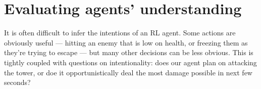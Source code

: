 \documentclass[ocean-paper.tex]{subfiles}
\begin{document}
\section{Evaluating agents’ understanding}\label{sec:results:understanding}


It is often difficult to infer the intentions of an RL agent.
Some actions are obviously useful --- hitting an enemy that is low on health, or freezing them as they're trying to escape --- but many other decisions can be less obvious.
This is tightly coupled with questions on intentionality: does our agent plan on attacking the tower, or doe it opportunistically deal the most damage possible in next few seconds?
\end{document}
